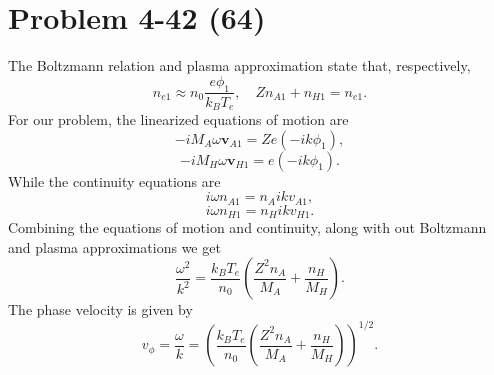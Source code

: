 \section*{Problem 4-42 (64)}
\label{sec:4-42}
The Boltzmann relation and plasma approximation state that, respectively, 
\begin{equation*}
	n_{e1} \approx n_0\dfrac{e\phi_1}{k_BT_e}, \quad Zn_{A1} + n_{H1} = n_{e1}.
\end{equation*}
For our problem, the linearized equations of motion are
\begin{equation*}
	-iM_A\omega\bm{v}_{A1} = Ze\left(-ik\phi_1\right),
\end{equation*}
\begin{equation*}
-iM_H\omega\bm{v}_{H1} = e\left(-ik\phi_1\right).
\end{equation*}
While the continuity equations are
\begin{equation*}
	i\omega n_{A1} = n_{A}ikv_{A1},
\end{equation*} 
\begin{equation*}
	i\omega n_{H1} = n_{H}ikv_{H1}.
\end{equation*}
Combining the equations of motion and continuity, along with out Boltzmann and plasma approximations we get 
\begin{equation*}
	\dfrac{\omega^2}{k^2} = \dfrac{k_BT_e}{n_0}\left(\dfrac{Z^2n_A}{M_A} + \dfrac{n_H}{M_H} \right).
\end{equation*}
The phase velocity is given by
\begin{equation*}
	v_\phi = \dfrac{\omega}{k} = \left(\dfrac{k_BT_e}{n_0}\left(\dfrac{Z^2n_A}{M_A} + \dfrac{n_H}{M_H} \right)\right)^{1/2}.
\end{equation*}

